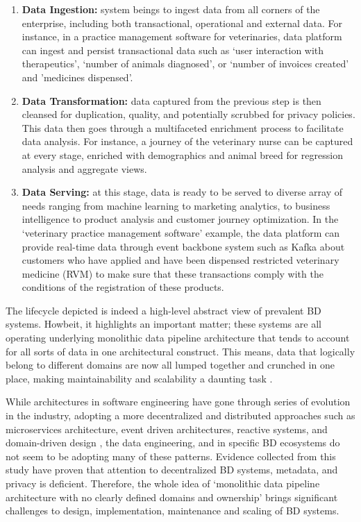 \documentclass{bmcart}
\begin{document}
\begin{enumerate}
    \item \textbf{Data Ingestion:} system beings to ingest data from all corners of the enterprise, including both transactional, operational and external data. For instance, in a practice management software for veterinaries, data platform can ingest and persist transactional data such as `user interaction with therapeutics', `number of animals diagnosed', or `number of invoices created' and 'medicines dispensed'.
    \item \textbf{Data Transformation:} data captured from the previous step is then cleansed for duplication, quality, and potentially scrubbed for privacy policies. This data then goes through a multifaceted enrichment process to facilitate data analysis. For instance, a journey of the veterinary nurse can be captured at every stage, enriched with demographics and animal breed for regression analysis and aggregate views.
    \item \textbf{Data Serving:} at this stage, data is ready to be served to diverse array of needs ranging from machine learning to marketing analytics, to business intelligence to product analysis and customer journey optimization. In the `veterinary practice management software' example, the data platform can provide real-time data through event backbone system such as Kafka about customers who have applied and have been dispensed restricted veterinary medicine (RVM) to make sure that these transactions comply with the conditions of the registration of these products.
\end{enumerate}

The lifecycle depicted is indeed a high-level abstract view of prevalent BD systems. Howbeit, it highlights an important matter; these systems are all operating underlying monolithic data pipeline architecture that tends to account for all sorts of data in one architectural construct. This means, data that logically belong to different domains are now all lumped together and crunched in one place, making maintainability and scalability a daunting task \cite{monolithToMesh}.

While architectures in software engineering have gone through series of evolution in the industry, adopting a more decentralized and distributed approaches such as microservices architecture, event driven architectures, reactive systems, and domain-driven design \cite{alshuqayran2016systematic}, the data engineering, and in specific BD ecosystems do not seem to be adopting many of these patterns. Evidence collected from this study have proven that attention to decentralized BD systems, metadata, and privacy is deficient. Therefore, the whole idea of `monolithic data pipeline architecture with no clearly defined domains and ownership' brings significant challenges to design, implementation, maintenance and scaling of BD systems. 
\end{document}
